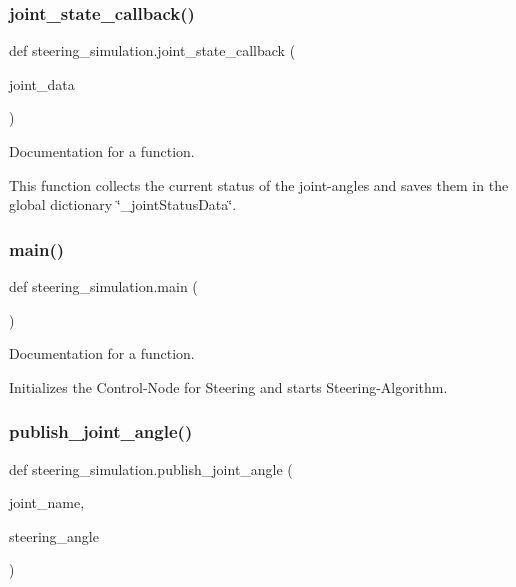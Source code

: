 \subsubsection{\texorpdfstring{joint\_state\_callback()}{joint\_state\_callback()}}
{\footnotesize\ttfamily def steering\+\_\+simulation.\+joint\+\_\+state\+\_\+callback (\begin{DoxyParamCaption}\item[{}]{joint\+\_\+data }\end{DoxyParamCaption})}



Documentation for a function. 

This function collects the current status of the joint-\/angles and saves them in the global dictionary \char`\"{}\+\_\+joint\+Status\+Data\char`\"{}. \mbox{\label{namespacesteering__simulation_af3dec39cd8650ad512084dfda32c577a}} 
\subsubsection{\texorpdfstring{main()}{main()}}
{\footnotesize\ttfamily def steering\+\_\+simulation.\+main (\begin{DoxyParamCaption}{ }\end{DoxyParamCaption})}



Documentation for a function. 

Initializes the Control-\/\+Node for Steering and starts Steering-\/\+Algorithm. \mbox{\label{namespacesteering__simulation_aa303bfd6d5e874d19fda9e678aa4c3d9}} 
\subsubsection{\texorpdfstring{publish\_joint\_angle()}{publish\_joint\_angle()}}
{\footnotesize\ttfamily def steering\+\_\+simulation.\+publish\+\_\+joint\+\_\+angle (\begin{DoxyParamCaption}\item[{}]{joint\+\_\+name,  }\item[{}]{steering\+\_\+angle }\end{DoxyParamCaption})}



